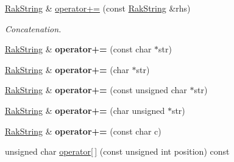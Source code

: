 \begin{DoxyCompactItemize}
\item 
\hypertarget{class_rak_net_1_1_rak_string_a3ab5bc11f39600303d838b10813a1383}{\hyperlink{class_rak_net_1_1_rak_string}{Rak\-String} \& \hyperlink{class_rak_net_1_1_rak_string_a3ab5bc11f39600303d838b10813a1383}{operator+=} (const \hyperlink{class_rak_net_1_1_rak_string}{Rak\-String} \&rhs)}\label{class_rak_net_1_1_rak_string_a3ab5bc11f39600303d838b10813a1383}

\begin{DoxyCompactList}\small\item\em Concatenation. \end{DoxyCompactList}\item 
\hypertarget{class_rak_net_1_1_rak_string_a2b77ba09d61288967c1712bc3253a24e}{\hyperlink{class_rak_net_1_1_rak_string}{Rak\-String} \& {\bfseries operator+=} (const char $\ast$str)}\label{class_rak_net_1_1_rak_string_a2b77ba09d61288967c1712bc3253a24e}

\item 
\hypertarget{class_rak_net_1_1_rak_string_a65c51d58627db61f13185a20ff3ca4a0}{\hyperlink{class_rak_net_1_1_rak_string}{Rak\-String} \& {\bfseries operator+=} (char $\ast$str)}\label{class_rak_net_1_1_rak_string_a65c51d58627db61f13185a20ff3ca4a0}

\item 
\hypertarget{class_rak_net_1_1_rak_string_a7a5ef43020cce0df7458b515040575ff}{\hyperlink{class_rak_net_1_1_rak_string}{Rak\-String} \& {\bfseries operator+=} (const unsigned char $\ast$str)}\label{class_rak_net_1_1_rak_string_a7a5ef43020cce0df7458b515040575ff}

\item 
\hypertarget{class_rak_net_1_1_rak_string_ac04f4b32e5286b9ae610e1abc2d65363}{\hyperlink{class_rak_net_1_1_rak_string}{Rak\-String} \& {\bfseries operator+=} (char unsigned $\ast$str)}\label{class_rak_net_1_1_rak_string_ac04f4b32e5286b9ae610e1abc2d65363}

\item 
\hypertarget{class_rak_net_1_1_rak_string_a8e9728406a08db03c5cb181d5f19dbd7}{\hyperlink{class_rak_net_1_1_rak_string}{Rak\-String} \& {\bfseries operator+=} (const char c)}\label{class_rak_net_1_1_rak_string_a8e9728406a08db03c5cb181d5f19dbd7}

\item 
\hypertarget{class_rak_net_1_1_rak_string_a6eda78ce277dfa2575ec9d13a8c19b13}{unsigned char \hyperlink{class_rak_net_1_1_rak_string_a6eda78ce277dfa2575ec9d13a8c19b13}{operator\mbox{[}$\,$\mbox{]}} (const unsigned int position) const }\label{class_rak_net_1_1_rak_string_a6eda78ce277dfa2575ec9d13a8c19b13}


\end{DoxyCompactItemize}
